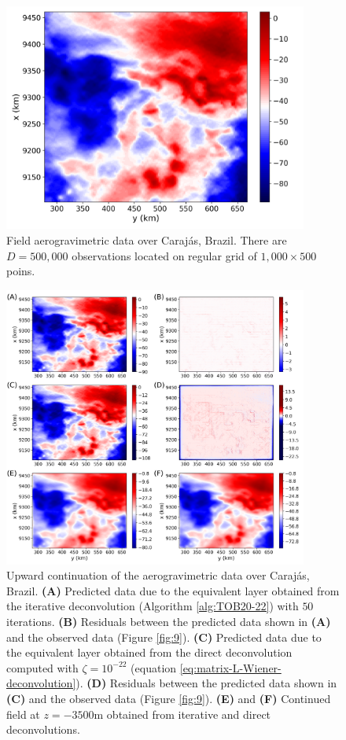 \begin{figure}[htbp]
	\begin{center}
		\includegraphics[width=10cm]{Fig/carajas-data}
	\end{center}
	\caption{
		Field aerogravimetric data over Caraj{\'a}s, Brazil. 
		There are $D = 500, 000$ observations located on regular grid of $1,000 \times 500$ poins.
		}
	\label{fig:carajas-data}
\end{figure}

\begin{figure}[htbp]
	\begin{center}
		\includegraphics[width=10cm]{Fig/carajas-continued}
	\end{center}
	\caption{
		Upward continuation of the aerogravimetric data over Caraj{\'a}s, Brazil.
		\textbf{(A)} Predicted data due to the equivalent layer obtained from the iterative deconvolution 
		(Algorithm \ref{alg:TOB20-22}) with $50$ iterations.
		\textbf{(B)} Residuals between the predicted data shown in \textbf{(A)} and the observed data (Figure \ref{fig:9}). 
		\textbf{(C)} Predicted data due to the equivalent layer obtained from the direct deconvolution computed with $\zeta = 10^{-22}$
		(equation \ref{eq:matrix-L-Wiener-deconvolution}). 
		\textbf{(D)} Residuals between the predicted data shown in \textbf{(C)} and the observed data (Figure \ref{fig:9}). 
		\textbf{(E)} and \textbf{(F)} Continued field at $z = -3500 \mathrm{m}$ obtained from iterative and direct deconvolutions.
		}
	\label{fig:carajas-continued}
\end{figure}

